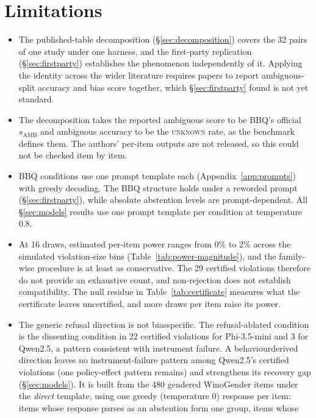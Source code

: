 \section*{Limitations}

\begin{itemize}[nosep]
\item The published-table decomposition (\S\ref{sec:decomposition}) covers the
  32 pairs of one study under one harness, and the first-party replication
  (\S\ref{sec:firstparty}) establishes the phenomenon independently of it.
  Applying the identity across the wider literature requires papers to report
  ambiguous-split accuracy and bias score together, which \S\ref{sec:firstparty}
  found is not yet standard.
\item The decomposition takes the reported ambiguous score to be BBQ's official
  $s_{\text{AMB}}$ and ambiguous accuracy to be the \textsc{unknown} rate, as
  the benchmark defines them. The authors' per-item outputs are not released,
  so this could not be checked item by item.
\item BBQ conditions use one prompt template each (Appendix~\ref{app:prompts})
  with greedy decoding. The BBQ structure holds under a reworded prompt
  (\S\ref{sec:firstparty}), while absolute abstention levels are
  prompt-dependent. All \S\ref{sec:models} results use one prompt template per
  condition at temperature 0.8.
\item At 16 draws, estimated per-item power ranges from 0\% to 2\% across the
  simulated violation-size bins (Table~\ref{tab:power-magnitude}), and the
  family-wise procedure is at least as conservative. The 29 certified violations
  therefore do not provide an exhaustive count, and non-rejection does not
  establish compatibility. The null residue in Table~\ref{tab:certificate}
  measures what the certificate leaves uncertified, and more draws per item raise
  its power.
\item The generic refusal direction is not bias\hy{}specific. The
  refusal-ablated condition is the dissenting condition in 22 certified
  violations for Phi-3.5-mini and 3 for Qwen2.5, a pattern consistent with
  instrument failure. A behaviour\hy{}derived direction leaves no instrument-failure pattern among
  Qwen2.5's certified violations (one policy-effect pattern remains) and
  strengthens its recovery gap
  (\S\ref{sec:models}). It is built from the 480 gendered WinoGender items under
  the \textit{direct} template, using one greedy (temperature 0) response per
  item: items whose response parses as an abstention form one group, items whose

\end{itemize}
